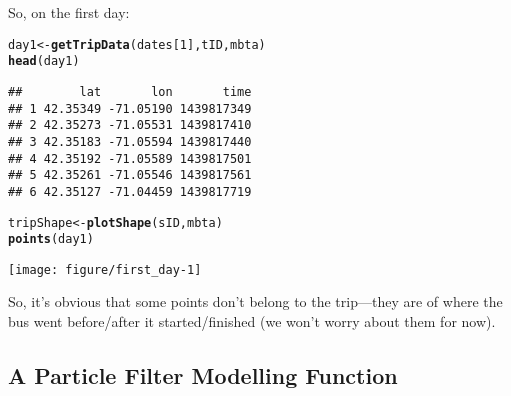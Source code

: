 \documentclass[11pt]{article}\usepackage[]{graphicx}\usepackage[]{color}
\makeatletter
\def\maxwidth{ %
  \ifdim\Gin@nat@width>\linewidth
    \linewidth
  \else
    \Gin@nat@width
  \fi
}
\newcommand{\hlnum}[1]{\textcolor[rgb]{0.686,0.059,0.569}{#1}}%
\newcommand{\hlstd}[1]{\textcolor[rgb]{0.345,0.345,0.345}{#1}}%
\newcommand{\hlkwb}[1]{\textcolor[rgb]{0.69,0.353,0.396}{#1}}%
\newcommand{\hlkwd}[1]{\textcolor[rgb]{0.737,0.353,0.396}{\textbf{#1}}}%
\newenvironment{kframe}{%
 \def\at@end@of@kframe{}%
 \ifinner\ifhmode%
  \def\at@end@of@kframe{\end{minipage}}%
  \begin{minipage}{\columnwidth}%
 \fi\fi%
 \def\FrameCommand##1{\hskip\@totalleftmargin \hskip-\fboxsep
 \colorbox{shadecolor}{##1}\hskip-\fboxsep
     \hskip-\linewidth \hskip-\@totalleftmargin \hskip\columnwidth}%
 \MakeFramed {\advance\hsize-\width
   \@totalleftmargin\z@ \linewidth\hsize
   \@setminipage}}%
 {\par\unskip\endMakeFramed%
 \at@end@of@kframe}
\newenvironment{knitrout}{}{} %
\makeatother
\begin{document}
So, on the first day:
\begin{knitrout}
\color{fgcolor}\begin{kframe}
\begin{alltt}
\hlstd{day1} \hlkwb{<-} \hlkwd{getTripData}\hlstd{(dates[}\hlnum{1}\hlstd{], tID, mbta)}
\hlkwd{head}\hlstd{(day1)}
\end{alltt}
\begin{verbatim}
##        lat       lon       time
## 1 42.35349 -71.05190 1439817349
## 2 42.35273 -71.05531 1439817410
## 3 42.35183 -71.05594 1439817440
## 4 42.35192 -71.05589 1439817501
## 5 42.35261 -71.05546 1439817561
## 6 42.35127 -71.04459 1439817719
\end{verbatim}
\begin{alltt}
\hlstd{tripShape} \hlkwb{<-} \hlkwd{plotShape}\hlstd{(sID, mbta)}
\hlkwd{points}\hlstd{(day1)}
\end{alltt}
\end{kframe}

{\centering \texttt{[image: figure/first\_day-1]} 

}



\end{knitrout}

So, it's obvious that some points don't belong to the trip---they are of where the bus went
before/after it started/finished (we won't worry about them for now).

\subsection{A Particle Filter Modelling Function}
\end{document}
